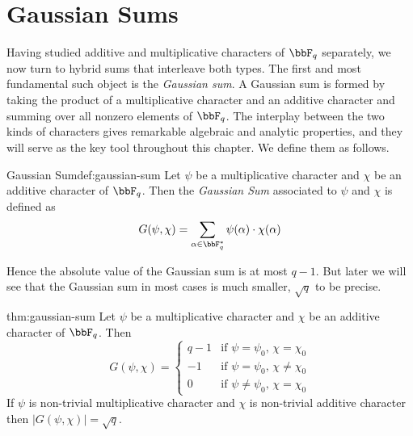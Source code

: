 \section{Gaussian Sums}
Having studied additive and multiplicative characters of $\bbF_q$ separately, we now turn to hybrid sums that interleave both types. The first and most fundamental such object is the \emph{Gaussian sum}. A Gaussian sum is formed by taking the product of a multiplicative character and an additive character and summing over all nonzero elements of $\bbF_q$. The interplay between the two kinds of characters gives remarkable algebraic and analytic properties, and they will serve as the key tool throughout this chapter. We define them as follows.
\begin{Definition}{Gaussian Sum}{def:gaussian-sum}
  Let $\psi $ be a multiplicative character and $\chi$ be an additive character of $\bbF_q$. Then the \emph{Gaussian Sum} associated to $\psi$ and $\chi$ is defined as $$G(\psi,\chi)=\sum_{\alpha\in\bbF_q^*}\psi(\alpha)\cdot \chi(\alpha)$$
\end{Definition}
Hence the absolute value of the Gaussian sum is at most $q-1$. But later we will see that the Gaussian sum in most cases is much smaller, $\sqrt{q}$ to be precise.
\begin{Theorem}{}{thm:gaussian-sum}
  Let $\psi$ be a multiplicative character and $\chi$ be an additive character of $\bbF_q$. Then \begin{equation}
    G(\psi,\chi)=\begin{cases}
      q-1 & \text{if $\psi=\psi_0$, $\chi=\chi_0$}     \\
      -1  & \text{if $\psi=\psi_0$, $\chi\neq \chi_0$} \\
      0   & \text{if $\psi\neq \psi_0$, $\chi=\chi_0$}
    \end{cases}
  \end{equation}
  If $\psi$ is non-trivial multiplicative character and $\chi$ is non-trivial additive character then $|G(\psi,\chi)|=\sqrt{q}$.
\end{Theorem}

